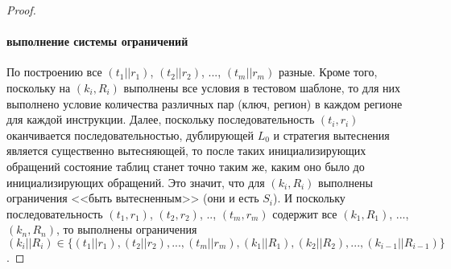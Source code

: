 \begin{proof}
\paragraph{выполнение системы ограничений} По построению все $(t_1||r_1)$, $(t_2||r_2)$, ..., $(t_m||r_m)$ разные. Кроме того, поскольку на $(k_i, R_i)$ выполнены все условия в тестовом шаблоне, то для них выполнено условие количества различных пар (ключ, регион) в каждом регионе для каждой инструкции. Далее, поскольку последовательность $(t_i, r_i)$ оканчивается последовательностью, дублирующей $L_0$ и стратегия вытеснения является существенно вытесняющей, то после таких инициализирующих обращений состояние таблиц станет точно таким же, каким оно было до инициализирующих обращений. Это значит, что для $(k_i, R_i)$ выполнены ограничения <<быть вытесненным>> (они и есть $S_i$). И поскольку последовательность $(t_1, r_1)$, $(t_2, r_2)$, .., $(t_m, r_m)$ содержит все $(k_1, R_1)$, ..., $(k_n, R_n)$, то выполнены ограничения\\$(k_i||R_i) \in \{(t_1||r_1), (t_2||r_2), ..., (t_m||r_m), (k_1||R_1), (k_2||R_2), ..., (k_{i-1}||R_{i-1})\}$.
\end{proof}


